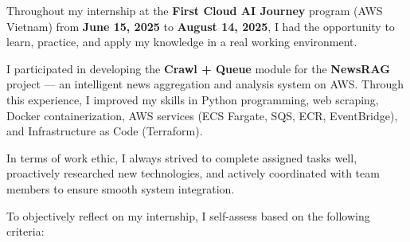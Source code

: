 Throughout my internship at the \textbf{First Cloud AI Journey} program
(AWS Vietnam) from \textbf{June 15, 2025} to \textbf{August 14, 2025}, I
had the opportunity to learn, practice, and apply my knowledge in a real
working environment.

I participated in developing the \textbf{Crawl + Queue} module for the
\textbf{NewsRAG} project --- an intelligent news aggregation and
analysis system on AWS. Through this experience, I improved my skills in
Python programming, web scraping, Docker containerization, AWS services
(ECS Fargate, SQS, ECR, EventBridge), and Infrastructure as Code
(Terraform).

In terms of work ethic, I always strived to complete assigned tasks
well, proactively researched new technologies, and actively coordinated
with team members to ensure smooth system integration.

To objectively reflect on my internship, I self-assess based on the
following criteria:

